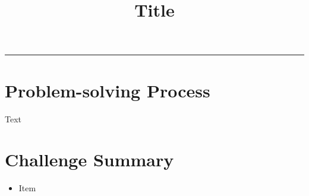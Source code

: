 \documentclass[11pt]{article}
\title{Title}
\makeatletter
\renewcommand{\maketitle}{%
  \begin{flushleft}
    {\LARGE\bfseries \@title}
  \end{flushleft}
  \vspace{1em}
}
\makeatother
\begin{document}
\maketitle

\hrule

\section*{Problem-solving Process}

Text

\section*{Challenge Summary}

\begin{itemize}[leftmargin=*]
  \item Item
\end{itemize}
\end{document}
